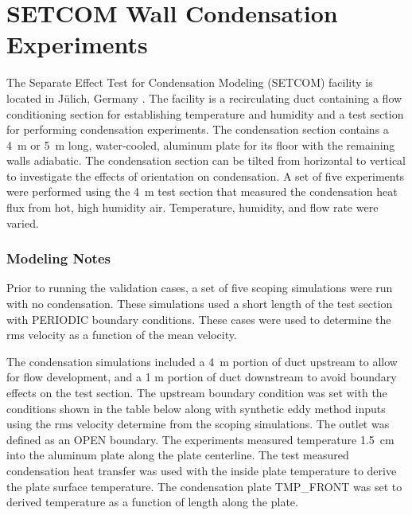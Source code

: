 \section{SETCOM Wall Condensation Experiments}
\label{SETCOM_Cond_Description}

The Separate Effect Test for Condensation Modeling (SETCOM) facility is located in J\"{u}lich, Germany \cite{setcom_cfd}. The facility is a recirculating duct containing a flow conditioning section for establishing temperature and humidity and a test section for performing condensation experiments. The condensation section contains a 4~m or 5~m long, water-cooled, aluminum plate for its floor with the remaining walls adiabatic. The condensation section can be tilted from horizontal to vertical to investigate the effects of orientation on condensation. A set of five experiments were performed using the 4~m test section that measured the condensation heat flux from hot, high humidity air. Temperature, humidity, and flow rate were varied.

\subsubsection{Modeling Notes}

Prior to running the validation cases, a set of five scoping simulations were run with no condensation. These simulations used a short length of the test section with {\ct PERIODIC} boundary conditions. These cases were used to determine the rms velocity as a function of the mean velocity.

The condensation simulations included a 4~m portion of duct upstream to allow for flow development, and a 1 m portion of duct downstream to avoid boundary effects on the test section. The upstream boundary condition was set with the conditions shown in the table below along with synthetic eddy method inputs using the rms velocity determine from the scoping simulations. The outlet was defined as an {\ct OPEN} boundary. The experiments measured temperature 1.5~cm into the aluminum plate along the plate centerline. The test measured condensation heat transfer was used with the inside plate temperature to derive the plate surface temperature. The condensation plate {\ct TMP\_FRONT} was set to derived temperature as a function of length along the plate.

